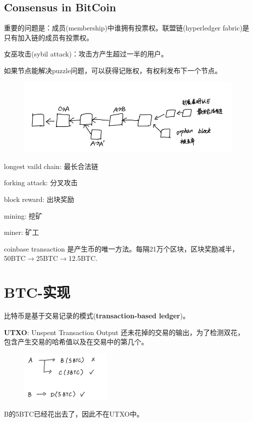 \documentclass[10pt]{ctexart}
\begin{document}
\subsection{Consensus in BitCoin}
重要的问题是：成员(membership)中谁拥有投票权。联盟链(hyperledger fabric)是只有加入链的成员有投票权。

女巫攻击(sybil attack)：攻击方产生超过一半的用户。

如果节点能解决puzzle问题，可以获得记账权，有权利发布下一个节点。
\begin{figure}[H]
    \centering
    \includegraphics[width=1\textwidth]{./lecture4/img7.png} 
\end{figure}
longest vaild chain: 最长合法链

forking attack: 分叉攻击

block reward: 出块奖励

mining: 挖矿

miner: 矿工

coinbase transaction 是产生币的唯一方法。每隔21万个区块，区块奖励减半，50BTC$\rightarrow$25BTC$\rightarrow$12.5BTC.
\section{BTC-实现}
比特币是基于交易记录的模式(\textbf{transaction-based ledger})。

\textbf{UTXO}: Unspent Transaction Output 还未花掉的交易的输出，为了检测双花，包含产生交易的哈希值以及在交易中的第几个。
\begin{figure}[H]
    \centering
    \includegraphics[width=0.4\textwidth]{./lecture5/img1.png} 
\end{figure}
B的5BTC已经花出去了，因此不在UTXO中。
\end{document}
